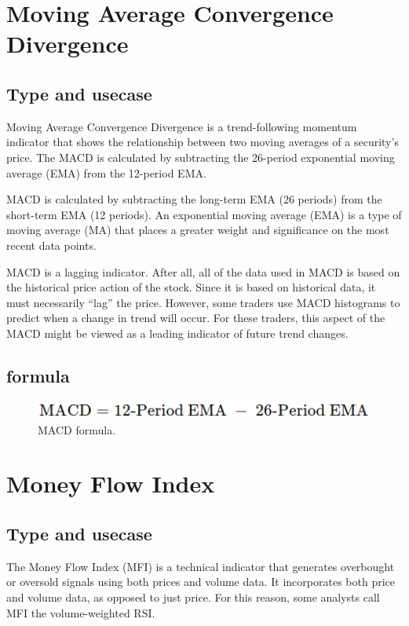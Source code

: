 \documentclass[12pt,a4paper]{article}
\begin{document}
\section{Moving Average Convergence Divergence}

\subsection{Type and usecase}
Moving Average Convergence Divergence is a trend-following momentum indicator that shows the relationship between two moving averages of a security's price. The MACD is calculated by subtracting the 26-period exponential moving average (EMA) from the 12-period EMA.

MACD is calculated by subtracting the long-term EMA (26 periods) from the short-term EMA (12 periods). An exponential moving average (EMA) is a type of moving average (MA) that places a greater weight and significance on the most recent data points.


MACD is a lagging indicator. After all, all of the data used in MACD is based on the historical price action of the stock. Since it is based on historical data, it must necessarily “lag” the price. However, some traders use MACD histograms to predict when a change in trend will occur. For these traders, this aspect of the MACD might be viewed as a leading indicator of future trend changes.

\subsection{formula}

\begin{figure}[H]
    \includegraphics[scale=0.7]{../images/MACD.png}
    \caption{MACD formula.}
    \label{fig:MACD}
\end{figure}

\section{Money Flow Index}

\subsection{Type and usecase}
The Money Flow Index (MFI) is a technical indicator that generates overbought or oversold signals using both prices and volume data.
It incorporates both price and volume data, as opposed to just price. For this reason, some analysts call MFI the volume-weighted RSI.
\end{document}
